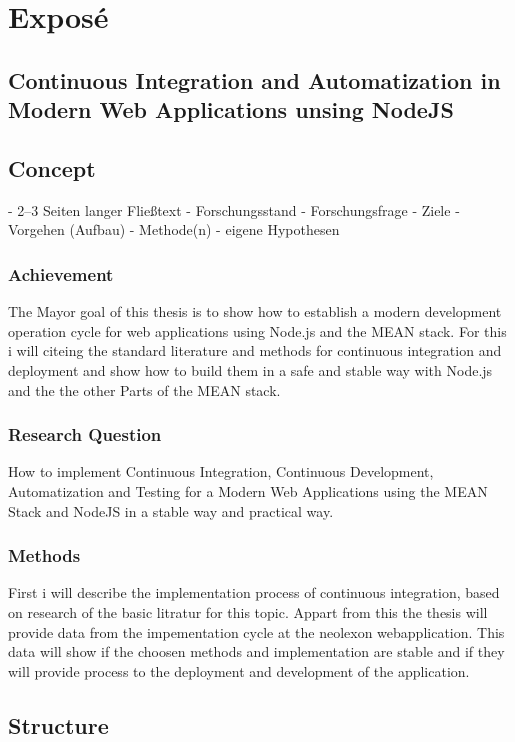 \section{Exposé}

\subsection{Continuous Integration and Automatization in Modern Web Applications unsing NodeJS}


\subsection{Concept}
- 2–3 Seiten langer Fließtext
- Forschungsstand
- Forschungsfrage
- Ziele
- Vorgehen (Aufbau)
- Methode(n) 
- eigene Hypothesen

\subsubsection{Achievement}
The Mayor goal of this thesis is to show how to establish a modern development operation cycle for
web applications using Node.js and the MEAN stack. For this i will citeing the standard literature and methods for continuous
integration and deployment and show how to build them in a safe and stable way with Node.js and the
the other Parts of the MEAN stack.

\subsubsection{Research Question}
How to implement Continuous Integration, Continuous Development, Automatization and Testing for a Modern Web Applications
using the MEAN Stack and NodeJS in a stable way and practical way.

\subsubsection{Methods}
First i will describe the implementation process of continuous integration, based on research of the basic litratur for this
topic. Appart from this the thesis will provide data from the impementation cycle at the neolexon webapplication.
This data will show if the choosen methods and implementation are stable and if they will provide process to the deployment
and development of the application.

\subsection{Structure}
